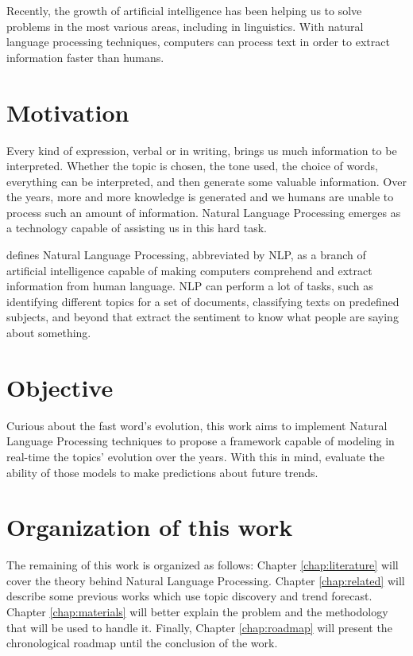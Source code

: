 Recently, the growth of artificial intelligence has been helping us to solve problems in the most various areas, including in linguistics. With natural language processing techniques, computers can process text in order to extract information faster than humans.

\section{Motivation}

Every kind of expression, verbal or in writing, brings us much information to be interpreted. Whether the topic is chosen, the tone used, the choice of words, everything can be interpreted, and then generate some valuable information. Over the years, more and more knowledge is generated and we humans are unable to process such an amount of information. Natural Language Processing emerges as a technology capable of assisting us in this hard task.

 defines Natural Language Processing, abbreviated by NLP, as a branch of artificial intelligence capable of making computers comprehend and extract information from human language. NLP can perform a lot of tasks, such as identifying different topics for a set of documents, classifying texts on predefined subjects, and beyond that extract the sentiment to know what people are saying about something.

% 

\section{Objective}

Curious about the fast word's evolution, this work aims to implement Natural Language Processing techniques to propose a framework capable of modeling in real-time the topics' evolution over the years. With this in mind, evaluate the ability of those models to make predictions about future trends.

\section{Organization of this work}

The remaining of this work is organized as follows: Chapter \ref{chap:literature} will cover the theory behind Natural Language Processing. Chapter \ref{chap:related} will describe some previous works which use topic discovery and trend forecast. Chapter \ref{chap:materials} will better explain the problem and the methodology that will be used to handle it. Finally, Chapter \ref{chap:roadmap} will present the chronological roadmap until the conclusion of the work.
